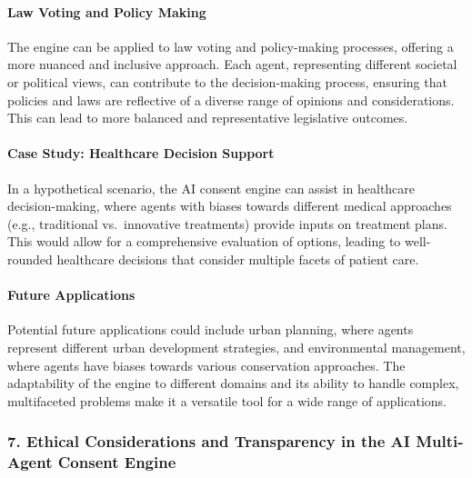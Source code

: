 \hypertarget{law-voting-and-policy-making}{%
\paragraph{Law Voting and Policy
Making}\label{law-voting-and-policy-making}}

The engine can be applied to law voting and policy-making processes,
offering a more nuanced and inclusive approach. Each agent, representing
different societal or political views, can contribute to the
decision-making process, ensuring that policies and laws are reflective
of a diverse range of opinions and considerations. This can lead to more
balanced and representative legislative outcomes.

\hypertarget{case-study-healthcare-decision-support}{%
\paragraph{Case Study: Healthcare Decision
Support}\label{case-study-healthcare-decision-support}}

In a hypothetical scenario, the AI consent engine can assist in
healthcare decision-making, where agents with biases towards different
medical approaches (e.g., traditional vs.~innovative treatments) provide
inputs on treatment plans. This would allow for a comprehensive
evaluation of options, leading to well-rounded healthcare decisions that
consider multiple facets of patient care.

\hypertarget{future-applications}{%
\paragraph{Future Applications}\label{future-applications}}

Potential future applications could include urban planning, where agents
represent different urban development strategies, and environmental
management, where agents have biases towards various conservation
approaches. The adaptability of the engine to different domains and its
ability to handle complex, multifaceted problems make it a versatile
tool for a wide range of applications.

\hypertarget{ethical-considerations-and-transparency-in-the-ai-multi-agent-consent-engine}{%
\subsubsection{7. Ethical Considerations and Transparency in the AI
Multi-Agent Consent
Engine}\label{ethical-considerations-and-transparency-in-the-ai-multi-agent-consent-engine}}

